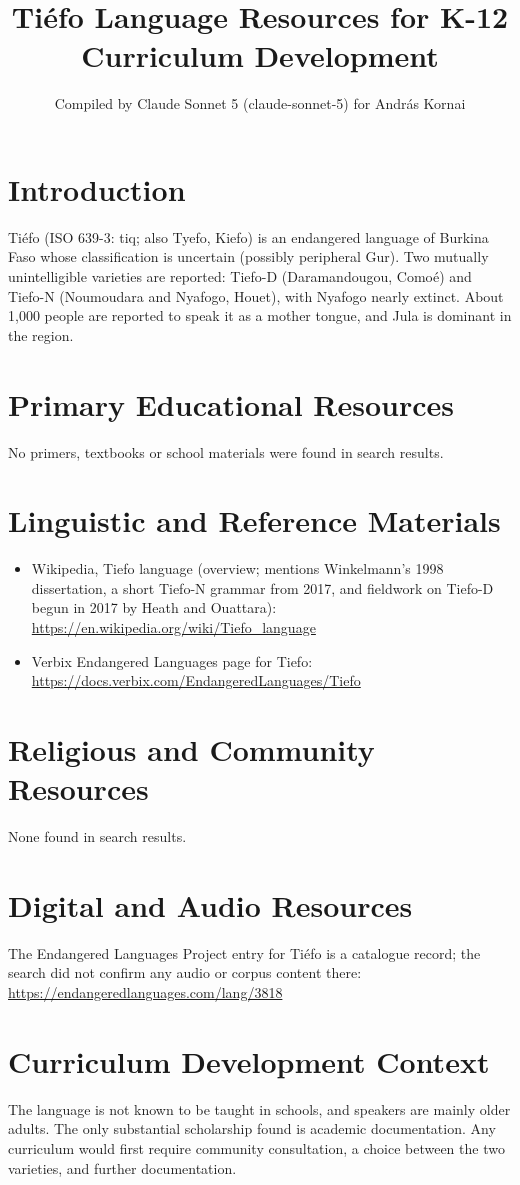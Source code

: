 \documentclass[12pt]{article}
\title{Tiéfo Language Resources for K-12 Curriculum Development}
\author{Compiled by Claude Sonnet 5 (claude-sonnet-5) for Andr\'as Kornai}
\date{}
\begin{document}
\maketitle

\section{Introduction}
Tiéfo (ISO 639-3: tiq; also Tyefo, Kiefo) is an endangered language of Burkina Faso whose classification is uncertain (possibly peripheral Gur). Two mutually unintelligible varieties are reported: Tiefo-D (Daramandougou, Comoé) and Tiefo-N (Noumoudara and Nyafogo, Houet), with Nyafogo nearly extinct. About 1,000 people are reported to speak it as a mother tongue, and Jula is dominant in the region.

\section{Primary Educational Resources}
No primers, textbooks or school materials were found in search results.

\section{Linguistic and Reference Materials}
\begin{itemize}
\item Wikipedia, Tiefo language (overview; mentions Winkelmann's 1998 dissertation, a short Tiefo-N grammar from 2017, and fieldwork on Tiefo-D begun in 2017 by Heath and Ouattara): \url{https://en.wikipedia.org/wiki/Tiefo_language}
\item Verbix Endangered Languages page for Tiefo: \url{https://docs.verbix.com/EndangeredLanguages/Tiefo}
\end{itemize}

\section{Religious and Community Resources}
None found in search results.

\section{Digital and Audio Resources}
The Endangered Languages Project entry for Tiéfo is a catalogue record; the search did not confirm any audio or corpus content there: \url{https://endangeredlanguages.com/lang/3818}

\section{Curriculum Development Context}
The language is not known to be taught in schools, and speakers are mainly older adults. The only substantial scholarship found is academic documentation. Any curriculum would first require community consultation, a choice between the two varieties, and further documentation.
\end{document}
